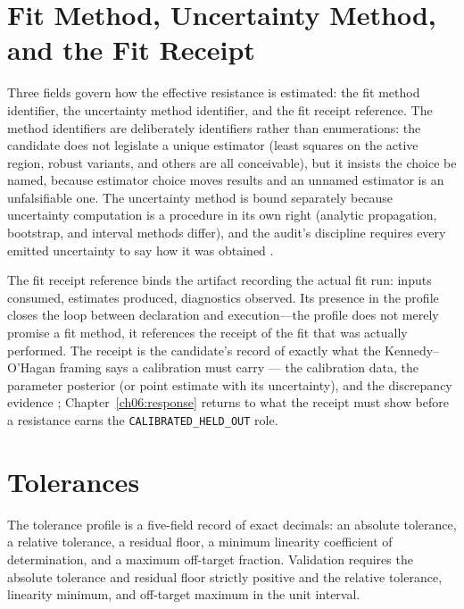 \section{Fit Method, Uncertainty Method, and the Fit Receipt}\label{ch05:fit}

Three fields govern how the effective resistance is estimated: the fit
method identifier, the uncertainty method identifier, and the fit receipt
reference. The method identifiers are deliberately identifiers rather than
enumerations: the candidate does not legislate a unique estimator (least
squares on the active region, robust variants, and others are all
conceivable), but it insists the choice be named, because estimator choice
moves results and an unnamed estimator is an unfalsifiable one. The
uncertainty method is bound separately because uncertainty computation is a
procedure in its own right (analytic propagation, bootstrap, and interval
methods differ), and the audit's discipline requires every emitted
uncertainty to say how it was obtained \cite{gum}.

The fit receipt reference binds the artifact recording the actual fit run:
inputs consumed, estimates produced, diagnostics observed. Its presence in
the profile closes the loop between declaration and execution---the profile
does not merely promise a fit method, it references the receipt of the fit
that was actually performed. The receipt is the candidate's record of
exactly what the Kennedy--O'Hagan framing says a calibration must carry ---
the calibration data, the parameter posterior (or point estimate with its
uncertainty), and the discrepancy evidence \cite{kennedyohagan}; Chapter~\ref{ch06:response} returns to
what the receipt must show before a resistance earns the
\texttt{CALIBRATED\_HELD\_OUT} role.

\section{Tolerances}\label{ch05:tolerances}

The tolerance profile is a five-field record of exact decimals: an absolute
tolerance, a relative tolerance, a residual floor, a minimum linearity
coefficient of determination, and a maximum off-target fraction. Validation
requires the absolute tolerance and residual floor strictly positive and the
relative tolerance, linearity minimum, and off-target maximum in the unit
interval.


